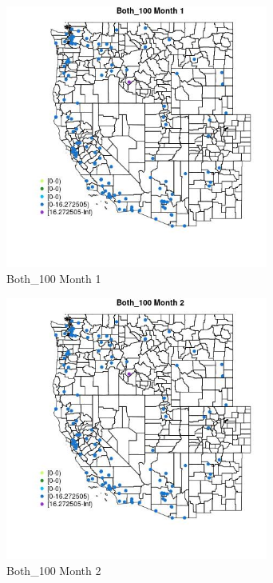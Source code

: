 \begin{figure} 
\centering  
\includegraphics[width=0.77\textwidth]{Code_Outputs/Report_ML_input_PM25_Step4_part_e_de_duplicated_aves_MapObsMo1Both_100.jpg} 
\caption{\label{fig:Report_ML_input_PM25_Step4_part_e_de_duplicated_avesMapObsMo1Both_100}Both_100 Month 1} 
\end{figure} 
 

\begin{figure} 
\centering  
\includegraphics[width=0.77\textwidth]{Code_Outputs/Report_ML_input_PM25_Step4_part_e_de_duplicated_aves_MapObsMo2Both_100.jpg} 
\caption{\label{fig:Report_ML_input_PM25_Step4_part_e_de_duplicated_avesMapObsMo2Both_100}Both_100 Month 2} 
\end{figure} 
 

